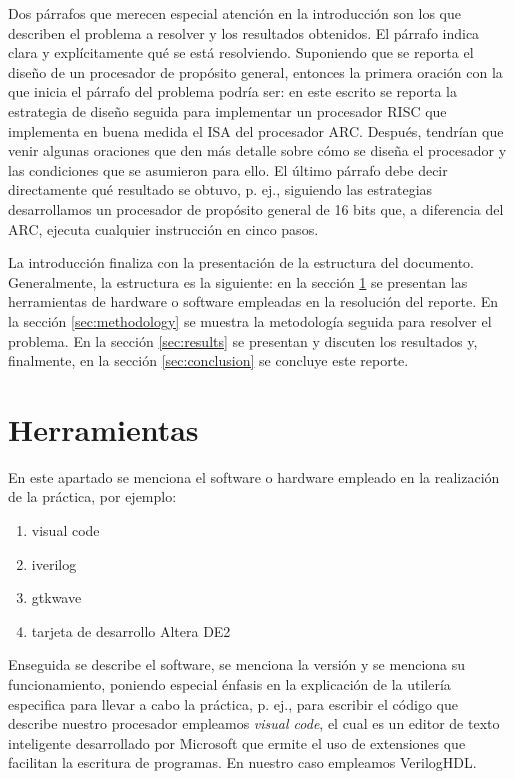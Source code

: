 \documentclass[10pt, twocolumn]{article}
\begin{document}
Dos párrafos que merecen especial atención en la introducción son los que describen el problema a resolver y los resultados obtenidos. El párrafo indica clara y explícitamente qué se está resolviendo. Suponiendo que se reporta el diseño de un procesador de propósito general, entonces la primera oración con la que inicia el párrafo del problema podría ser: en este escrito se reporta la estrategia de diseño seguida para implementar un procesador RISC que implementa en buena medida el ISA del procesador ARC. Después, tendrían que venir algunas oraciones que den más detalle sobre cómo se diseña el procesador y las condiciones que se asumieron para ello. El último párrafo debe decir directamente qué resultado se obtuvo, p. ej., siguiendo las estrategias desarrollamos un procesador de propósito general de 16 bits que, a diferencia del ARC, ejecuta cualquier instrucción en cinco pasos.

La introducción finaliza con la presentación de la estructura del documento. Generalmente, la estructura es la siguiente: en la sección \ref{sec:tools} se presentan las herramientas de hardware o software empleadas en la resolución del reporte. En la sección \ref{sec:methodology} se muestra la metodología seguida para resolver el problema. En la sección \ref{sec:results} se presentan y discuten los resultados y, finalmente, en la sección \ref{sec:conclusion} se concluye este reporte.


\section{Herramientas}\label{sec:tools}

En este apartado se menciona el software o hardware empleado en la realización de la práctica, por ejemplo:
\begin{enumerate}
    \item visual code
    \item iverilog
    \item gtkwave
    \item tarjeta de desarrollo Altera DE2
\end{enumerate}

Enseguida se describe el software, se menciona la versión y se menciona su funcionamiento, poniendo especial énfasis en la explicación de la utilería especifica para llevar a cabo la práctica, p. ej., para escribir el código que describe nuestro procesador empleamos \textit{visual code}, el cual es un editor de texto inteligente desarrollado por Microsoft que ermite el uso de extensiones que facilitan la escritura de programas. En nuestro caso empleamos VerilogHDL.
\end{document}
